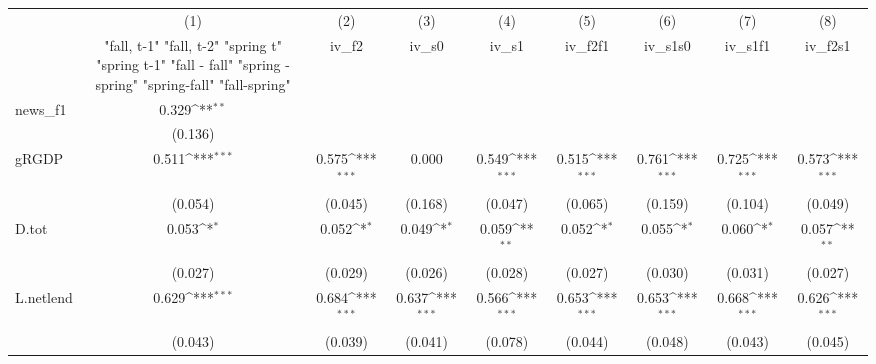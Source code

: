 {
\def\sym#1{\ifmmode^{#1}\else\(^{#1}\)\fi}
\begin{tabular}{l*{8}{c}}
\toprule
            &\multicolumn{1}{c}{(1)}&\multicolumn{1}{c}{(2)}&\multicolumn{1}{c}{(3)}&\multicolumn{1}{c}{(4)}&\multicolumn{1}{c}{(5)}&\multicolumn{1}{c}{(6)}&\multicolumn{1}{c}{(7)}&\multicolumn{1}{c}{(8)}\\
            &\multicolumn{1}{c}{  "fall, t-1" "fall, t-2" "spring t" "spring t-1"  "fall - fall" "spring - spring" "spring-fall" "fall-spring" }&\multicolumn{1}{c}{iv\_f2}&\multicolumn{1}{c}{iv\_s0}&\multicolumn{1}{c}{iv\_s1}&\multicolumn{1}{c}{iv\_f2f1}&\multicolumn{1}{c}{iv\_s1s0}&\multicolumn{1}{c}{iv\_s1f1}&\multicolumn{1}{c}{iv\_f2s1}\\
\midrule
news\_f1     &       0.329\sym{**} &                     &                     &                     &                     &                     &                     &                     \\
            &     (0.136)         &                     &                     &                     &                     &                     &                     &                     \\
\addlinespace
gRGDP       &       0.511\sym{***}&       0.575\sym{***}&       0.000         &       0.549\sym{***}&       0.515\sym{***}&       0.761\sym{***}&       0.725\sym{***}&       0.573\sym{***}\\
            &     (0.054)         &     (0.045)         &     (0.168)         &     (0.047)         &     (0.065)         &     (0.159)         &     (0.104)         &     (0.049)         \\
\addlinespace
D.tot       &       0.053\sym{*}  &       0.052\sym{*}  &       0.049\sym{*}  &       0.059\sym{**} &       0.052\sym{*}  &       0.055\sym{*}  &       0.060\sym{*}  &       0.057\sym{**} \\
            &     (0.027)         &     (0.029)         &     (0.026)         &     (0.028)         &     (0.027)         &     (0.030)         &     (0.031)         &     (0.027)         \\
\addlinespace
L.netlend   &       0.629\sym{***}&       0.684\sym{***}&       0.637\sym{***}&       0.566\sym{***}&       0.653\sym{***}&       0.653\sym{***}&       0.668\sym{***}&       0.626\sym{***}\\
            &     (0.043)         &     (0.039)         &     (0.041)         &     (0.078)         &     (0.044)         &     (0.048)         &     (0.043)         &     (0.045)         \\

\end{tabular}}
